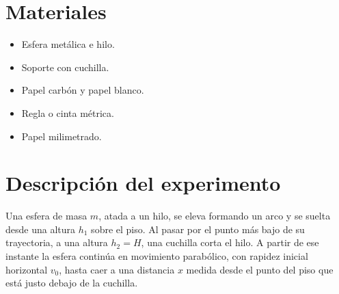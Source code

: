 \documentclass[11pt, letterpaper]{article}
\begin{document}
	\section{Materiales}
	\begin{itemize}
		\item Esfera metálica e hilo.
		\item Soporte con cuchilla.
		\item Papel carbón y papel blanco.
		\item Regla o cinta métrica.
		\item Papel milimetrado.
	\end{itemize}
	
	\section{Descripción del experimento}
	
	Una esfera de masa $m$, atada a un hilo, se eleva formando un arco y se suelta
	desde una altura $h_1$ sobre el piso. Al pasar por el punto más bajo de su
	trayectoria, a una altura $h_2 = H$, una cuchilla corta el hilo. A partir de ese
	instante la esfera continúa en movimiento parabólico, con rapidez inicial
	horizontal $v_0$, hasta caer a una distancia $x$ medida desde el punto del piso
	que está justo debajo de la cuchilla.
	
\end{document}
